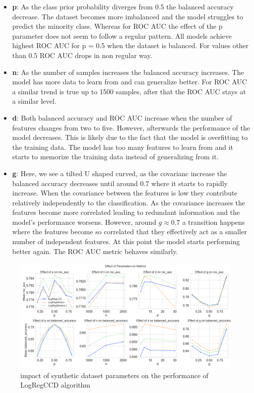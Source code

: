 \documentclass[11pt]{article}
\begin{document}
\begin{itemize}
    \item \textbf{p}: As the class prior probability diverges from 0.5 the balanced accuracy decrease. The dataset becomes more imbalanced and the model struggles to predict the minority class. Whereas for ROC AUC the effect of the p parameter does not seem to follow a regular pattern. All models achieve highest ROC AUC for p = 0.5 when the dataset is balanced. For values other than 0.5 ROC AUC drops in non regular way.
    \item \textbf{n}: As the number of samples increases the balanced accuracy increases. The model has more data to learn from and can generalize better. For ROC AUC a similar trend is true up to 1500 samples, after that the ROC AUC stays at a similar level.
    \item \textbf{d}: Both balanced accuracy and ROC AUC increase when the number of features changes from two to five. However, afterwards the performance of the model decreases. This is likely due to the fact that the model is overfitting to the training data. The model has too many features to learn from and it starts to memorize the training data instead of generalizing from it.
    \item \textbf{g}: Here, we see a tilted U shaped curved, as the covarianc increase the balanced accuracy decreases until around 0.7 where it starts to rapidly increase. When the covariance between the features is low they contribute relatively independently to the classification. As the covariance increases the features become more correlated leading to redundant information and the model's performance worsens. However, around $g \approx 0.7$ a transition happens where the features become so correlated that they effectively act as a smaller number of independent features. At this point the model starts performing better again. The ROC AUC metric behaves similarly.
    
\end{itemize}

\begin{figure}[h]
    \centering
  \includegraphics[width=\textwidth]{../results/parameter_facet_grid.png}
    \caption{impact of synthetic dataset parameters on the performance of LogRegCCD algorithm}
    \label{fig:synthetic-dataset-parameters}
  \end{figure}
\end{document}
